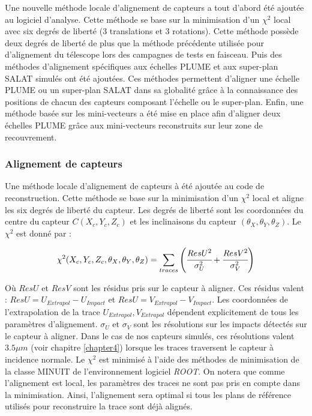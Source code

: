    \medskip
   
   Une nouvelle m\'ethode locale d'alignement de capteurs a tout d'abord \'et\'e ajout\'ee au logiciel d'analyse. Cette m\'ethode se base sur la minimisation d'un $\chi^2$ local avec six degr\'es de libert\'e (3 translations et 3 rotations). Cette m\'ethode poss\`ede deux degr\'es de libert\'e de plus que la m\'ethode pr\'ec\'edente utilis\'ee pour d'alignement du t\'elescope lors des campagnes de tests en faisceau. Puis des m\'ethodes d'alignement spécifiques aux \'echelles PLUME et aux super-plan SALAT simul\'es ont \'et\'e ajout\'ees. Ces m\'ethodes permettent d'aligner une \'echelle PLUME ou un super-plan SALAT dans sa globalit\'e gr\^ace \`a la connaissance des positions de chacun des capteurs composant l'\'echelle ou le super-plan. Enfin, une m\'ethode bas\'ee sur les mini-vecteurs a \'et\'e mise en place afin d'aligner deux \'echelles PLUME grâce aux mini-vecteurs reconstruits sur leur zone de recouvrement.
   
   \subsubsection{Alignement de capteurs}
   
   Une m\'ethode locale d'alignement de capteurs \`a \'et\'e ajout\'ee au code de reconstruction. Cette m\'ethode se base sur la minimisation d'un $\chi^2$ local et aligne les six degr\'es de libert\'e du capteur. Les degr\'es de libert\'e sont les coordonn\'ees du centre du capteur $C(X_c,Y_c,Z_c)$ et les inclinaisons du capteur $(\theta_X, \theta_Y, \theta_Z)$. Le $\chi^2$ est donn\'e par :
   
   \begin{equation}
    \chi^2(X_c, Y_c, Z_c, \theta_X, \theta_Y, \theta_Z) = \sum_{traces} \left( \cfrac{ResU^2}{\sigma_U^2} + \cfrac{ResV^2}{\sigma_V^2} \right)
   \end{equation}

   O\`u $ResU$ et $ResV$ sont les r\'esidus pris sur le capteur \`a aligner. Ces r\'esidus valent : $ResU = U_{Extrapol} - U_{Impact}$ et $ResU = V_{Extrapol} - V_{Impact}$. Les coordonn\'ees de l'extrapolation de la trace $U_{Extrapol}, V_{Extrapol}$ d\'ependent explicitement de tous les param\`etres d'alignement. $\sigma_U$ et $\sigma_V$ sont les r\'esolutions sur les impacts d\'etect\'es sur le capteur \`a aligner. Dans le cas de nos capteurs simul\'es, ces r\'esolutions valent $3.5 \mu m$ (voir chapitre \ref{chapter4}) lorsque les traces traversent le capteur \`a incidence normale. Le $\chi^2$ est minimis\'e \`a l'aide des m\'ethodes de minimisation de la classe MINUIT de l'environnement logiciel \textit{ROOT}. On notera que comme l'alignement est local, les param\`etres des traces ne sont pas pris en compte dans la minimisation. Ainsi, l'alignement sera optimal si tous les plans de r\'ef\'erence utilis\'es pour reconstruire la trace sont d\'ej\`a align\'es.
   
